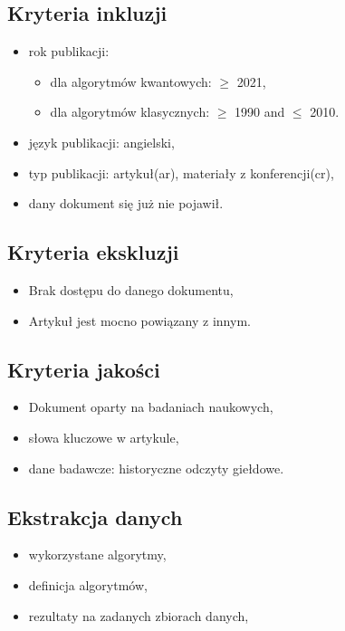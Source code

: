 \documentclass[polish,envcountsect,10pt]{article}
\begin{document}
\subsection{Kryteria inkluzji}
\begin{itemize}
	\item rok publikacji: 
	\begin{itemize}
		\item dla algorytmów kwantowych: $\ge$ 2021,
		\item dla algorytmów klasycznych: $\ge$ 1990 and $\le$ 2010.
	\end{itemize}
	\item język publikacji: angielski,
	\item typ publikacji: artykuł(ar), materiały z konferencji(cr),
	\item dany dokument się już nie pojawił.
\end{itemize}

\subsection{Kryteria ekskluzji}

\begin{itemize}
	\item Brak dostępu do danego dokumentu,
	\item Artykuł jest mocno powiązany z innym.
\end{itemize}

\subsection{Kryteria jakości}

\begin{itemize}
	\item Dokument oparty na badaniach naukowych,
	\item słowa kluczowe w artykule,
	\item dane badawcze: historyczne odczyty giełdowe.
\end{itemize}

\subsection{Ekstrakcja danych}

\begin{itemize}
	\item wykorzystane algorytmy,
	\item definicja algorytmów,
	\item rezultaty na zadanych zbiorach danych,
\end{itemize}
\end{document}
